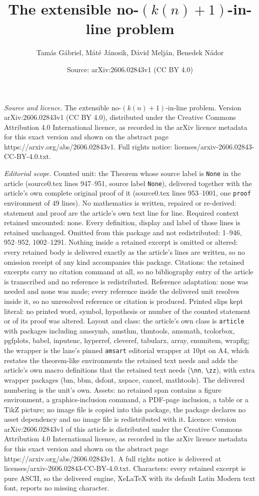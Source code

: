 \documentclass[10pt,a4paper]{amsart}
\title[The extensible no-$(k(n)+1)$-in-line problem]{The extensible no-$(k(n)+1)$-in-line problem}
\author{Tam\'as G\'abriel, M\'at\'e J\'anosik, D\'avid Melj\'an, Benedek N\'ador}
\date{Source: arXiv:2606.02843v1 (CC BY 4.0)}
\begin{document}
\maketitle

\noindent\emph{Source and licence.} The extensible no-$(k(n)+1)$-in-line problem. Version arXiv:2606.02843v1 (CC BY 4.0), distributed under the Creative Commons Attribution 4.0 International licence, as recorded in the arXiv licence metadata for this exact version and shown on the abstract page https://arxiv.org/abs/2606.02843v1. Full rights notice: licenses/arxiv-2606.02843-CC-BY-4.0.txt.\par\smallskip

\noindent\textit{Editorial scope.} Counted unit: the Theorem whose source label is \texttt{None} in the article (source0.tex lines 947--951, source label \texttt{None}), delivered together with the article's own complete original proof of it (source0.tex lines 953--1001, one \texttt{proof} environment of 49 lines). No mathematics is written, repaired or re-derived: statement and proof are the article's own text line for line. Required context retained uncounted: none. Every definition, display and label of those lines is retained unchanged. Omitted from this package and not redistributed: 1--946, 952--952, 1002--1291. Nothing inside a retained excerpt is omitted or altered: every retained body is delivered exactly as the article's lines are written, so no omission receipt of any kind accompanies this package. Citations: the retained excerpts carry no citation command at all, so no bibliography entry of the article is transcribed and no reference is redistributed. Reference adaptation: none was needed and none was made; every reference inside the delivered unit resolves inside it, so no unresolved reference or citation is produced. Printed slips kept literal: no printed word, symbol, hypothesis or number of the counted statement or of its proof was altered. Layout and class: the article's own class is \texttt{article} with packages including amssymb, amsthm, thmtools, amsmath, tcolorbox, pgfplots, babel, inputenc, hyperref, cleveref, tabularx, array, enumitem, wrapfig; the wrapper is the lane's pinned \texttt{amsart} editorial wrapper at 10pt on A4, which restates the theorem-like environments the retained text needs and adds the article's own macro definitions that the retained text needs (\texttt{\textbackslash nn}, \texttt{\textbackslash zz}), with extra wrapper packages (bm, bbm, dsfont, xspace, cancel, mathtools). The delivered numbering is the unit's own. Assets: no retained span contains a figure environment, a graphics-inclusion command, a PDF-page inclusion, a table or a TikZ picture; no image file is copied into this package, the package declares no asset dependency and no image file is redistributed with it. Licence: version arXiv:2606.02843v1 of this article is distributed under the Creative Commons Attribution 4.0 International licence, as recorded in the arXiv licence metadata for this exact version and shown on the abstract page https://arxiv.org/abs/2606.02843v1. A full rights notice is delivered at licenses/arxiv-2606.02843-CC-BY-4.0.txt. Characters: every retained excerpt is pure ASCII, so the delivered engine, XeLaTeX with its default Latin Modern text font, reports no missing character.
\end{document}
